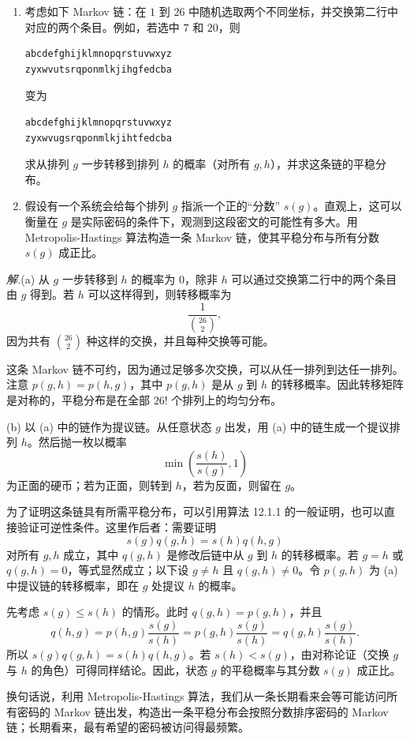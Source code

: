 \documentclass[UTF8,12pt,a4paper,fontset=fandol]{ctexart}
\begin{document}
\begin{enumerate}
  \item[(a)] 考虑如下 Markov 链：在 $1$ 到 $26$ 中随机选取两个不同坐标，并交换第二行中对应的两个条目。例如，若选中 $7$ 和 $20$，则
\begin{verbatim}
abcdefghijklmnopqrstuvwxyz
zyxwvutsrqponmlkjihgfedcba
\end{verbatim}
变为
\begin{verbatim}
abcdefghijklmnopqrstuvwxyz
zyxwvugsrqponmlkjihtfedcba
\end{verbatim}
求从排列 $g$ 一步转移到排列 $h$ 的概率（对所有 $g,h$），并求这条链的平稳分布。

  \item[(b)] 假设有一个系统会给每个排列 $g$ 指派一个正的“分数” $s(g)$。直观上，这可以衡量在 $g$ 是实际密码的条件下，观测到这段密文的可能性有多大。用 Metropolis-Hastings 算法构造一条 Markov 链，使其平稳分布与所有分数 $s(g)$ 成正比。
\end{enumerate}

\noindent\textit{解.}\quad (a) 从 $g$ 一步转移到 $h$ 的概率为 $0$，除非 $h$ 可以通过交换第二行中的两个条目由 $g$ 得到。若 $h$ 可以这样得到，则转移概率为
\[
  \frac{1}{\binom{26}{2}},
\]
因为共有 $\binom{26}{2}$ 种这样的交换，并且每种交换等可能。

这条 Markov 链不可约，因为通过足够多次交换，可以从任一排列到达任一排列。注意 $p(g,h)=p(h,g)$，其中 $p(g,h)$ 是从 $g$ 到 $h$ 的转移概率。因此转移矩阵是对称的，平稳分布是在全部 $26!$ 个排列上的均匀分布。

(b) 以 (a) 中的链作为提议链。从任意状态 $g$ 出发，用 (a) 中的链生成一个提议排列 $h$。然后抛一枚以概率
\[
  \min\left(\frac{s(h)}{s(g)},1\right)
\]
为正面的硬币；若为正面，则转到 $h$，若为反面，则留在 $g$。

为了证明这条链具有所需平稳分布，可以引用算法 12.1.1 的一般证明，也可以直接验证可逆性条件。这里作后者：需要证明
\[
  s(g)q(g,h)=s(h)q(h,g)
\]
对所有 $g,h$ 成立，其中 $q(g,h)$ 是修改后链中从 $g$ 到 $h$ 的转移概率。若 $g=h$ 或 $q(g,h)=0$，等式显然成立；以下设 $g\ne h$ 且 $q(g,h)\ne0$。令 $p(g,h)$ 为 (a) 中提议链的转移概率，即在 $g$ 处提议 $h$ 的概率。

先考虑 $s(g)\le s(h)$ 的情形。此时 $q(g,h)=p(g,h)$，并且
\[
  q(h,g)=p(h,g)\frac{s(g)}{s(h)}
  =p(g,h)\frac{s(g)}{s(h)}
  =q(g,h)\frac{s(g)}{s(h)}.
\]
所以 $s(g)q(g,h)=s(h)q(h,g)$。若 $s(h)<s(g)$，由对称论证（交换 $g$ 与 $h$ 的角色）可得同样结论。因此，状态 $g$ 的平稳概率与其分数 $s(g)$ 成正比。

换句话说，利用 Metropolis-Hastings 算法，我们从一条长期看来会等可能访问所有密码的 Markov 链出发，构造出一条平稳分布会按照分数排序密码的 Markov 链；长期看来，最有希望的密码被访问得最频繁。
\end{document}
